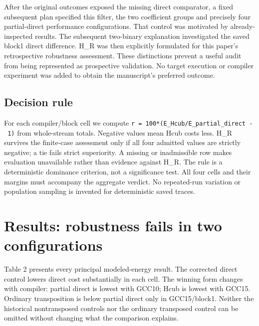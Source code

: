 \documentclass[conference]{IEEEtran}
\begin{document}
After the original outcomes exposed the missing direct comparator, a
fixed subsequent plan specified this filter, the two coefficient groups
and precisely four partial-direct performance configurations. That
control was motivated by already-inspected results. The subsequent
two-binary explanation investigated the saved block1 direct difference.
H\_R was then explicitly formulated for this paper's retrospective
robustness assessment. These distinctions prevent a useful audit from
being represented as prospective validation. No target execution or
compiler experiment was added to obtain the manuscript's preferred
outcome.

\subsection{Decision rule}\label{decision-rule}

For each compiler/block cell we compute
\texttt{r\ =\ 100*(E\_Hcub/E\_partial\_direct\ -\ 1)} from whole-stream
totals. Negative values mean Hcub costs less. H\_R survives the
finite-case assessment only if all four admitted values are strictly
negative; a tie fails strict superiority. A missing or inadmissible row
makes evaluation unavailable rather than evidence against H\_R. The rule
is a deterministic dominance criterion, not a significance test. All
four cells and their margins must accompany the aggregate verdict. No
repeated-run variation or population sampling is invented for
deterministic saved traces.

\section{Results: robustness fails in two configurations}\label{results-robustness-fails-in-two-configurations}

Table 2 presents every principal modeled-energy result. The corrected
direct control lowers direct cost substantially in each cell. The
winning form changes with compiler: partial direct is lowest with GCC10;
Hcub is lowest with GCC15. Ordinary transposition is below partial
direct only in GCC15/block1. Neither the historical nontransposed
controls nor the ordinary transposed control can be omitted without
changing what the comparison explains.
\end{document}
